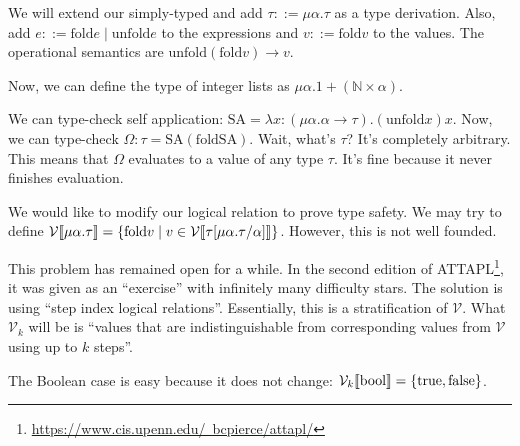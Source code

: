 We will extend our simply-typed \lc and add $\tau ::= \mu \alpha. \tau$ as a type derivation.
Also, add $e ::= \mathrm{fold} e \mid \mathrm{unfold} e$ to the expressions and $v ::= \mathrm{fold} v$
to the values. The operational semantics are $\mathrm{unfold} (\mathrm{fold} v) \to v$.

Now, we can define the type of integer lists as $\mu \alpha. 1 + (\mathbb{N} \times \alpha)$.

We can type-check self application: $\mathrm{SA} = \lambda x: (\mu \alpha. \alpha \to \tau). (\mathrm{unfold} x) x$.
Now, we can type-check $\Omega: \tau = \mathrm{SA} (\mathrm{fold SA})$. Wait, what's $\tau$? It's completely
arbitrary. This means that $\Omega$ evaluates to a value of any type $\tau$. It's fine because it never finishes
evaluation.

We would like to modify our logical relation to prove type safety. 
We may try to define 
$\mathcal{V} \llbracket \mu \alpha. \tau \rrbracket = \{ \mathrm{fold} v \mid v \in \mathcal{V}\llbracket \tau[\mu \alpha. \tau / \alpha] \rrbracket\}$.
However, this is not well founded. 

This problem has remained open for a while. 
In the second edition of ATTAPL\footnote{\href{https://www.cis.upenn.edu/~bcpierce/attapl/}{https://www.cis.upenn.edu/~bcpierce/attapl/}}, 
it was given as an ``exercise'' with infinitely many difficulty stars. The solution
is using ``step index logical relations''. Essentially, this is a stratification of $\mathcal{V}$.
What $\mathcal{V}_k$ will be is ``values that are indistinguishable from corresponding values from $\mathcal{V}$ using up to
$k$ steps''.

The Boolean case is easy because it does not change: $\mathcal{V}_k\llbracket \mathrm{bool} \rrbracket = \{\mathrm{true}, \mathrm{false}\}$.
